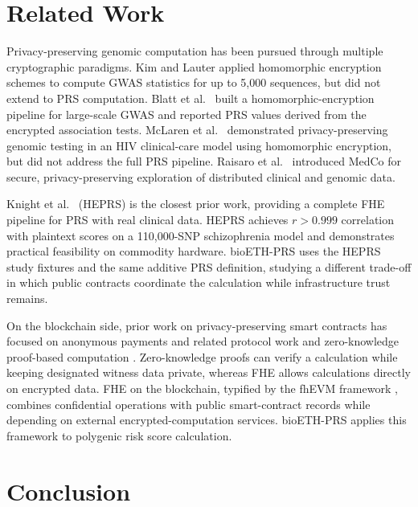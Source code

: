 \documentclass[10pt]{article}
\begin{document}
\section{Related Work}
\label{sec:related}

Privacy-preserving genomic computation has been pursued through multiple
cryptographic paradigms.  Kim and Lauter \citep{kim2015} applied homomorphic
encryption schemes to compute GWAS statistics for up to 5,000 sequences, but did not
extend to PRS computation.  Blatt et al.\ \citep{blatt2020} built a
homomorphic-encryption pipeline for large-scale GWAS and reported PRS values derived
from the encrypted association tests.  McLaren et al.\
\citep{mclaren2016} demonstrated privacy-preserving genomic testing in an HIV
clinical-care model using homomorphic encryption, but did not address the full PRS
pipeline.  Raisaro et al.\ \citep{raisaro2019} introduced MedCo for secure,
privacy-preserving exploration of distributed clinical and genomic data.

Knight et al.\ \citep{knight2026heprs} (HEPRS) is the closest prior work, providing a
complete FHE pipeline for PRS with real clinical data.  HEPRS achieves
$r > 0.999$ correlation with plaintext scores on a 110,000-SNP schizophrenia
model and demonstrates practical feasibility on commodity hardware.  bioETH-PRS
uses the HEPRS study fixtures and the same additive PRS definition, studying a
different trade-off in which public contracts coordinate the
calculation while infrastructure trust remains.

On the blockchain side, prior work on privacy-preserving smart contracts has
focused on anonymous payments and related protocol work
\citep{sasson2014zerocash,pertsev2019tornado} and
zero-knowledge proof-based computation \citep{ben2018starkware}.  Zero-knowledge proofs
can verify a calculation while keeping designated witness data private, whereas FHE
allows calculations directly on encrypted data.  FHE on the blockchain, typified by the fhEVM
framework \citep{zamafhevm}, combines confidential operations with public smart-contract
records while depending on external encrypted-computation services.  bioETH-PRS applies
this framework to polygenic risk score calculation.

\section{Conclusion}
\label{sec:conclusion}
\end{document}
